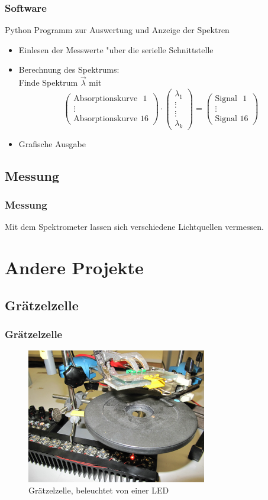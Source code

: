 \documentclass[10pt]{beamer}
\begin{document}
{
\frametitle{Software}
\begin{block}{Python Programm zur Auswertung und Anzeige der Spektren}
\begin{itemize}
\item Einlesen der Messwerte "uber die serielle Schnittstelle
\item Berechnung des Spektrums:\\[.5\baselineskip]
Finde Spektrum $\vec{\lambda}$ mit
\[
\begin{pmatrix}
\text{Absorptionskurve ~1}\\
\vdots\\
\text{Absorptionskurve 16}
\end{pmatrix}
\cdot
\begin{pmatrix}
\lambda_1\\
\vdots\\
\vdots\\
\lambda_k
\end{pmatrix}
=
\begin{pmatrix}
\text{Signal ~1}\\
\vdots\\
\text{Signal 16}
\end{pmatrix}
\]

\item Grafische Ausgabe
\end{itemize}
\end{block}
}
\subsection[]{Messung}
\frame
{
\frametitle{Messung}
Mit dem Spektrometer lassen sich verschiedene Lichtquellen vermessen.
}

\section{Andere Projekte}
\subsection[]{Gr\"atzelzelle}
\frame
{
\frametitle{Gr\"atzelzelle}
\begin{figure}
\begin{center}
\includegraphics[width=0.7\textwidth]{./images/prIMG_3497.jpg}
\caption{Gr\"atzelzelle, beleuchtet von einer LED}
\end{center}
\end{figure}
}
\end{document}
